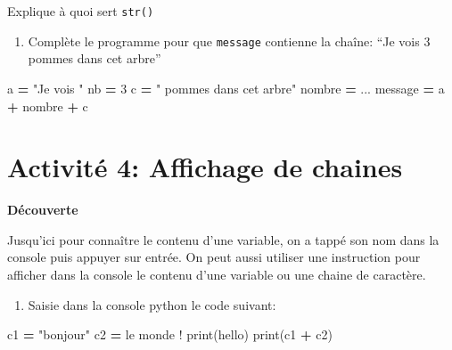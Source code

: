 \documentclass[
]{book}
\newenvironment{Shaded}{\begin{snugshade}}{\end{snugshade}}
\newcommand{\BuiltInTok}[1]{#1}
\newcommand{\DecValTok}[1]{\textcolor[rgb]{0.00,0.00,0.81}{#1}}
\newcommand{\NormalTok}[1]{#1}
\newcommand{\OperatorTok}[1]{\textcolor[rgb]{0.81,0.36,0.00}{\textbf{#1}}}
\newcommand{\StringTok}[1]{\textcolor[rgb]{0.31,0.60,0.02}{#1}}
\providecommand{\tightlist}{%
  \setlength{\itemsep}{0pt}\setlength{\parskip}{0pt}}
\def\tightlist{}
\begin{document}
Explique à quoi sert \texttt{str()}

\begin{enumerate}
\def\labelenumi{\arabic{enumi}.}
\setcounter{enumi}{5}
\tightlist
\item
  Complète le programme pour que \texttt{message} contienne la chaîne: ``Je vois 3 pommes dans cet arbre''
\end{enumerate}

\begin{Shaded}
\begin{Highlighting}[]
\NormalTok{a }\OperatorTok{=} \StringTok{"Je vois "}
\NormalTok{nb }\OperatorTok{=} \DecValTok{3}
\NormalTok{c }\OperatorTok{=} \StringTok{" pommes dans cet arbre"}
\NormalTok{nombre }\OperatorTok{=}\NormalTok{ ...}
\NormalTok{message }\OperatorTok{=}\NormalTok{ a }\OperatorTok{+}\NormalTok{ nombre }\OperatorTok{+}\NormalTok{ c}
\end{Highlighting}
\end{Shaded}

\newpage

\hypertarget{activituxe9-4-affichage-de-chaines}{%
\section{Activité 4: Affichage de chaines}\label{activituxe9-4-affichage-de-chaines}}

\textbf{Découverte}

Jusqu'ici pour connaître le contenu d'une variable, on a tappé son nom dans la console puis appuyer sur entrée. On peut aussi utiliser une instruction pour afficher dans la console le contenu d'une variable ou une chaine de caractère.

\begin{enumerate}
\def\labelenumi{\arabic{enumi}.}
\tightlist
\item
  Saisie dans la console python le code suivant:
\end{enumerate}

\begin{Shaded}
\begin{Highlighting}[]
\NormalTok{c1 }\OperatorTok{=} \StringTok{"bonjour"}
\NormalTok{c2 }\OperatorTok{=} \StringTok{\textquotesingle{} le monde !\textquotesingle{}}
\BuiltInTok{print}\NormalTok{(}\StringTok{\textquotesingle{}hello\textquotesingle{}}\NormalTok{)}
\BuiltInTok{print}\NormalTok{(c1 }\OperatorTok{+}\NormalTok{ c2)}
\end{Highlighting}
\end{Shaded}
\end{document}

